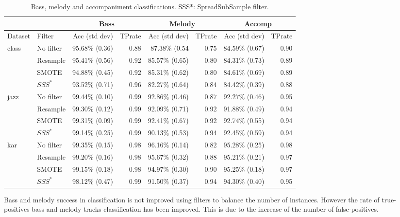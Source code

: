\documentclass{article}
\begin{document}
\begin{table}
\scriptsize
\begin{center}
\begin{tabular}{  l | l | r | r | r | r | r | r }
\hline
 &  & \multicolumn{2}{|c|}{Bass} &  \multicolumn{2}{|c|}{Melody} & \multicolumn{2}{|c|}{Accomp}  \\
\hline
Dataset & Filter & Acc (std dev) & TPrate & Acc (std dev) & TPrate & Acc (std dev) & TPrate \\
\hline
\hline
class & No filter & 95.68\% (0.36) & 0.88 & 87.38\% (0.54 & 0.75 & 84.59\% (0.67) & 0.90 \\
 & Resample & 95.41\% (0.56) & 0.92 & 85.57\% (0.65) & 0.80 & 84.31\% (0.73) & 0.89 \\
 & SMOTE & 94.88\% (0.45) & 0.92 & 85.31\% (0.62) & 0.80 & 84.61\% (0.69) & 0.89 \\
 & $SSS^*$ & 93.52\% (0.71) & 0.96 & 82.27\% (0.64) & 0.84 & 84.42\% (0.39) & 0.88 \\
\hline
jazz & No filter & 99.44\% (0.10) & 0.99 & 92.86\% (0.46) & 0.87 & 92.27\% (0.46) & 0.95 \\
 & Resample & 99.30\% (0.12) & 0.99 & 92.09\% (0.71) & 0.92 & 91.88\% (0.49) & 0.94 \\
 & SMOTE & 99.31\% (0.09) & 0.99 & 92.41\% (0.67) & 0.92 & 92.74\% (0.55) & 0.94 \\
 & $SSS^*$ & 99.14\% (0.25) & 0.99 & 90.13\% (0.53) & 0.94 & 92.45\% (0.59) & 0.94 \\
\hline
kar & No filter & 99.35\% (0.15) & 0.98 & 96.16\% (0.14) & 0.82 & 95.28\% (0.25) & 0.98 \\
 & Resample & 99.20\% (0.16) & 0.98 & 95.67\% (0.32) & 0.88 & 95.21\% (0.21) & 0.97 \\
 & SMOTE & 99.15\% (0.18) & 0.98 & 94.97\% (0.30) & 0.90 & 95.25\% (0.18) & 0.97 \\
 & $SSS^*$ & 98.12\% (0.47) & 0.99 & 91.50\% (0.37) & 0.94 & 94.30\% (0.40) & 0.95 \\
\hline
\end{tabular}
\caption{Bass, melody and accompaniment classifications. SSS*: SpreadSubSample filter.}
\label{table27}
\end{center}
\end{table}



Bass and melody success in classification is not improved using filters to balance the number of instances. However the rate of true-positives bass and melody tracks classification has been improved. This is due to the increase of the number of false-positives.
\end{document}
